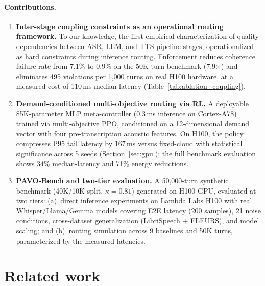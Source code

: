 \documentclass{article}
\begin{document}
\paragraph{Contributions.}
\begin{enumerate}[leftmargin=*,itemsep=2pt]
\item \textbf{Inter-stage coupling constraints as an operational routing framework.} To our knowledge, the first empirical characterization of quality dependencies between ASR, LLM, and TTS pipeline stages, operationalized as hard constraints during inference routing. Enforcement reduces coherence failure rate from 7.1\% to 0.9\% on the 50K-turn benchmark (7.9$\times$) and eliminates 495 violations per 1{,}000 turns on real H100 hardware, at a measured cost of 110\,ms median latency (Table~\ref{tab:ablation_coupling}).

\item \textbf{Demand-conditioned multi-objective routing via RL.} A deployable 85K-parameter MLP meta-controller (0.3\,ms inference on Cortex-A78) trained via multi-objective PPO, conditioned on a 12-dimensional demand vector with four pre-transcription acoustic features. On H100, the policy compresses P95 tail latency by 167\,ms versus fixed-cloud with statistical significance across 5 seeds (Section~\ref{sec:gpu}); the full benchmark evaluation shows 34\% median-latency and 71\% energy reductions.

\item \textbf{PAVO-Bench and two-tier evaluation.} A 50{,}000-turn synthetic benchmark (40K/10K split, $\kappa=0.81$) generated on H100 GPU, evaluated at two tiers: (a)~direct inference experiments on Lambda Labs H100 with real Whisper/Llama/Gemma models covering E2E latency (200 samples), 21 noise conditions, cross-dataset generalization (LibriSpeech + FLEURS), and model scaling; and (b)~routing simulation across 9 baselines and 50K turns, parameterized by the measured latencies.
\end{enumerate}

\section{Related work}
\label{sec:related}
\end{document}
